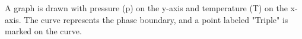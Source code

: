 A graph is drawn with pressure (p) on the y-axis and temperature (T) on the x-axis. The curve represents the phase boundary, and a point labeled "Triple" is marked on the curve.